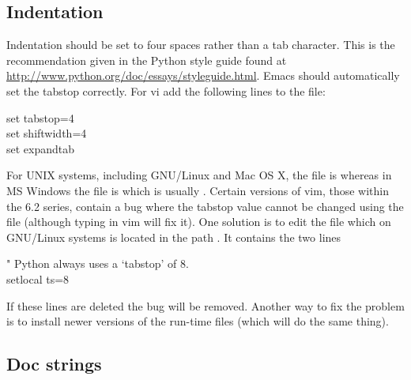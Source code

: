 \subsection{Indentation}

Indentation should be set to four spaces rather than a tab character.
This is the recommendation given in the Python style guide found at \href{http://www.python.org/doc/essays/styleguide.html}{http://www.python.org/doc/essays/styleguide.html}.
Emacs should automatically set the tabstop correctly.
For vi add the following lines to the  file:

\begin{exampleenv}
set tabstop=4 \\
set shiftwidth=4 \\
set expandtab
\end{exampleenv}

For UNIX systems, including GNU/Linux and Mac OS X, the  file is  whereas in MS Windows the file is  which is usually .
Certain versions of vim, those within the 6.2 series, contain a bug where the tabstop value cannot be changed using the  file (although typing  in vim will fix it).
One solution is to edit the file  which on GNU/Linux systems is located in the path .
It contains the two lines

\begin{exampleenv}
" Python always uses a `tabstop' of 8. \\
setlocal ts=8
\end{exampleenv}

If these lines are deleted the bug will be removed.
Another way to fix the problem is to install newer versions of the run-time files (which will do the same thing).



\subsection{Doc strings}

